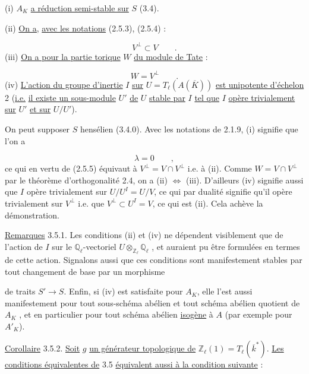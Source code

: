 (i) $A_K$ \underline{a réduction semi-stable sur} $S$ (3.4).

(ii) \underline{On a,} \underline{avec les notations} (2.5.3), (2.5.4) :

\begin{equation*}
V^{\perp} \subset V \qquad .
\end{equation*}
(iii) \underline{On a pour la partie torique} $W$ \underline{du module de Tate} :

\begin{equation*}
W = V^{\perp} \qquad .
\end{equation*}
(iv) \underline{L'action du groupe d'inertie} $I$ \underline{sur} $U = T_{\ell}(A(\overline{K}))$ \underline{est unipotente d'échelon} 2 (\underline{i.e.} \underline{il existe un sous-module} $U'$ \underline{de} $U$ \underline{stable par} $I$ \underline{tel que} $I$ \underline{opère trivialement sur} $U'$ \underline{et sur} $U/U'$).

On peut supposer $S$ hensélien (3.4.0). Avec les notations de 2.1.9, (i) signifie que l'on a

\begin{equation*}
\lambda = 0 \qquad ,
\end{equation*}
ce qui en vertu de (2.5.5) équivaut à $V^{\perp} = V \cap V^{\perp}$ i.e. à (ii). Comme $W=V\cap V^{\perp}$ par le théorème d'orthogonalité 2.4, on a (ii) $\Longleftrightarrow$ (iii). D'ailleurs (iv) signifie aussi que $I$ opère trivialement sur $U/U^{I}=U/V$, ce qui par dualité signifie qu'il opère trivialement sur $V^{\perp}$ i.e. que $V^{\perp} \subset U^{I}=V$, ce qui est (ii). Cela achève la démonstration.

\underline{Remarques} 3.5.1. Les conditions (ii) et (iv) ne dépendent visiblement que de l'action de $I$ sur le $\mathbb{Q}_{\ell}$-vectoriel $U \otimes_{\mathbb{Z}_{\ell}} \mathbb{Q}_{\ell}$ , et auraient pu être formulées en termes de cette action. Signalons aussi que ces conditions sont manifestement stables par tout changement de base par un morphisme



de traits $S' \longrightarrow S$. Enfin, si (iv) est satisfaite pour $A_K$, elle l'est aussi manifestement pour tout sous-schéma abélien et tout schéma abélien quotient de $A_K$ , et en particulier pour tout schéma abélien \underline{isogène} à $A$ (par exemple pour $A'_K$).

\underline{Corollaire} 3.5.2. \underline{Soit} $g$ \underline{un générateur topologique de} $\mathbb{Z}_\ell(1) = T_\ell(\overline{k}^*)$. \underline{Les conditions équivalentes de} 3.5 \underline{équivalent aussi à la condition suivante} :

